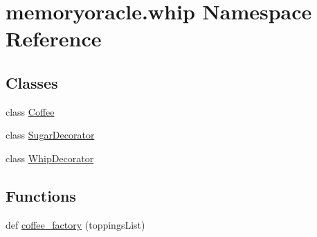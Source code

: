\hypertarget{namespacememoryoracle_1_1whip}{}\section{memoryoracle.\+whip Namespace Reference}
\label{namespacememoryoracle_1_1whip}
\subsection*{Classes}
\begin{DoxyCompactItemize}
\item 
class \hyperlink{classmemoryoracle_1_1whip_1_1Coffee}{Coffee}
\item 
class \hyperlink{classmemoryoracle_1_1whip_1_1SugarDecorator}{Sugar\+Decorator}
\item 
class \hyperlink{classmemoryoracle_1_1whip_1_1WhipDecorator}{Whip\+Decorator}
\end{DoxyCompactItemize}
\subsection*{Functions}
\begin{DoxyCompactItemize}
\item 
def \hyperlink{namespacememoryoracle_1_1whip_ab9ffad7c18a9ef305221ac23e51d72cd}{coffee\+\_\+factory} (toppings\+List)
\end{DoxyCompactItemize}
